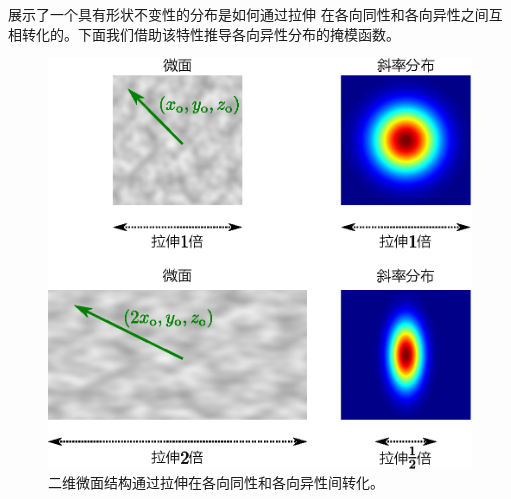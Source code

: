 展示了一个具有形状不变性的分布是如何通过拉伸
在各向同性和各向异性之间互相转化的。下面我们借助该特性推导各向异性分布的掩模函数。
\begin{figure}[htbp]
    \centering
    \includegraphics[width=0.8\linewidth]{Pictures/chap08/Anisotropic-Shape-Invariant-Distributions-of-Slopes.eps}
    \caption{二维微面结构通过拉伸在各向同性和各向异性间转化。}
    \label{fig:08ex01-2D-Anisotropic-Stretch}
\end{figure}


